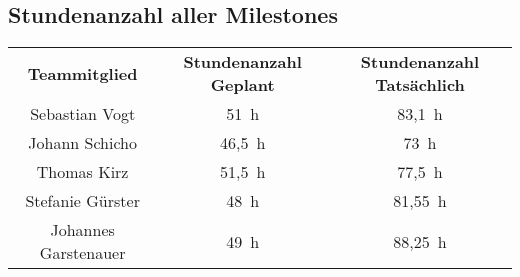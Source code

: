\begin{landscape}
	\subsection{Stundenanzahl aller Milestones}
	\begin{center}
		\begin{tabular}{ c c c }
			\textbf{Teammitglied} & \textbf{Stundenanzahl Geplant} & \textbf{Stundenanzahl Tatsächlich} \\
			Sebastian Vogt & 51~h & 83,1~h \\
			Johann Schicho & 46,5~h & 73~h \\
			Thomas Kirz & 51,5~h & 77,5~h \\
			Stefanie Gürster & 48~h & 81,55~h \\
			Johannes Garstenauer & 49~h & 88,25~h
		\end{tabular}
	\end{center}
\end{landscape}